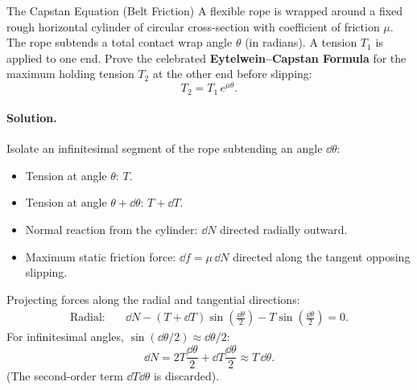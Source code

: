 \begin{workedexample}{The Capstan Equation (Belt Friction)}
A flexible rope is wrapped around a fixed rough horizontal cylinder of circular cross-section with coefficient of friction $\mu$. The rope subtends a total contact wrap angle $\theta$ (in radians).
A tension $T_1$ is applied to one end.
Prove the celebrated \textbf{Eytelwein--Capstan Formula} for the maximum holding tension $T_2$ at the other end before slipping:
\[
T_2 = T_1\,e^{\mu\theta}.
\]

\paragraph{Solution.}

Isolate an infinitesimal segment of the rope subtending an angle $\dd\theta$:
\begin{itemize}[leftmargin=1.4em,itemsep=2pt]
  \item Tension at angle $\theta$: $T$.
  \item Tension at angle $\theta + \dd\theta$: $T + \dd T$.
  \item Normal reaction from the cylinder: $\dd N$ directed radially outward.
  \item Maximum static friction force: $\dd f = \mu\,\dd N$ directed along the tangent opposing slipping.
\end{itemize}
Projecting forces along the radial and tangential directions:
\begin{align*}
\text{Radial:}\quad & \dd N - (T + \dd T)\sin\left(\frac{\dd\theta}{2}\right) - T\sin\left(\frac{\dd\theta}{2}\right) = 0.
\end{align*}
For infinitesimal angles, $\sin(\dd\theta/2) \approx \dd\theta/2$:
\[
\dd N = 2T\frac{\dd\theta}{2} + \dd T\frac{\dd\theta}{2} \approx T\,\dd\theta.
\]
(The second-order term $\dd T\dd\theta$ is discarded).


\end{workedexample}
